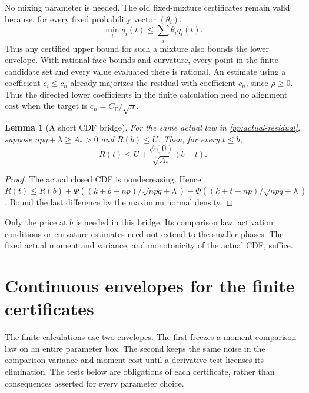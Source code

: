 \documentclass[aop,preprint]{imsart}
\newtheorem{lemma}[theorem]{Lemma}
\theoremstyle{definition}
\newcommand{\CE}{C_{\mathrm E}}
\numberwithin{equation}{section}
\begin{document}
No mixing parameter is needed. The old fixed-mixture certificates
remain valid because, for every fixed probability vector $(\theta_i)$,
\[
 \min_iq_i(t)\le\sum_i\theta_iq_i(t).
\]
Thus any certified upper bound for such a mixture also bounds the
lower envelope. With rational face bounds and curvature, every point
in the finite candidate set and every value evaluated there is rational.
An estimate using a coefficient $c_i\le c_n$ already majorizes
the residual with coefficient $c_n$, since $\rho\ge0$.
Thus the directed lower coefficients in the finite calculation need
no alignment cost when the target is $c_n=\CE/\sqrt n$.

\begin{lemma}[A short CDF bridge]\label{pp:cdf-bridge}
For the same actual law in \eqref{pp:actual-residual}, suppose
$npq+\lambda\ge A_*>0$ and $R(b)\le U$. Then, for every $t\le b$,
\begin{equation}\label{pp:bridge-bound}
 R(t)\le U+\frac{\phi(0)}{\sqrt{A_*}}(b-t).
\end{equation}
\end{lemma}
\begin{proof}
The actual closed CDF is nondecreasing. Hence
$R(t)\le R(b)+\Phi((k+b-np)/\sqrt{npq+\lambda})
-\Phi((k+t-np)/\sqrt{npq+\lambda})$.
Bound the last difference by the maximum normal density.
\end{proof}

Only the price at $b$ is needed in this bridge. Its comparison
law, activation conditions or curvature estimates need not extend
to the smaller phases. The fixed actual moment and variance, and
monotonicity of the actual CDF, suffice.

\section{Continuous envelopes for the finite certificates}\label{ce:section}

The finite calculations use two envelopes. The first freezes a
moment-comparison law on an entire parameter box. The second keeps the
same noise in the comparison variance and moment cost until a derivative
test licenses its elimination. The tests below are obligations of each
certificate, rather than consequences asserted for every parameter choice.
\end{document}
